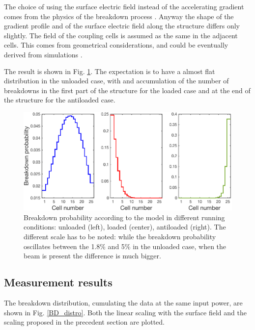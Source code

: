 The choice of using the surface electric field instead of the accelerating gradient comes from the physics of the breakdown process \cite{Walter:PC}. Anyway the shape of the gradient profile and of the surface electric field along the structure differs only slightly. The field of the coupling cells is assumed as the same in the adjacent cells. This comes from geometrical considerations, and could be eventually derived from simulations \cite{Alexej:PC}.

The result is shown in Fig. \ref{BD_prob}. The expectation is to have a almost flat distribution in the unloaded case, with and accumulation of the number of breakdowns in the first part of the structure for the loaded case and at the end of the structure for the antiloaded case.


\begin{figure}[h]
\centering 
\includegraphics[scale=0.45]{pictures/BD_probability.png}
\caption{Breakdown probability according to the model in different running conditions: unloaded (left), loaded (center), antiloaded (right). The different scale has to be noted: while the breakdown probability oscillates between the 1.8\% and 5\% in the unloaded case, when the beam is present the difference is much bigger.}
\label{BD_prob}
\end{figure}


\subsection[Measurement results]{Measurement results}

The breakdown distribution, cumulating the data at the same input power, are shown in Fig. \ref{BD_distro}. Both the linear scaling with the surface field and the scaling proposed in the precedent section are plotted.

